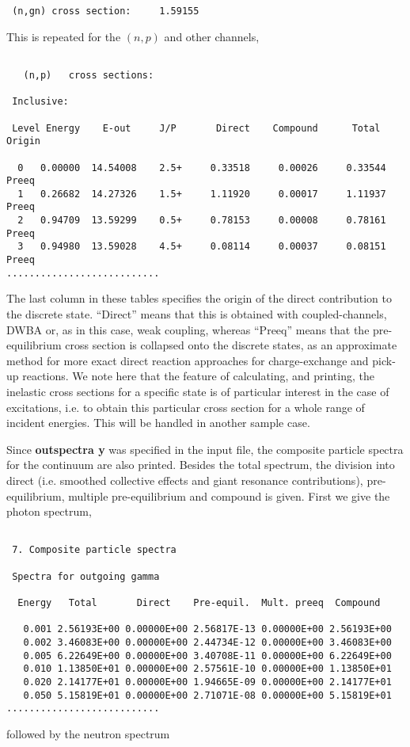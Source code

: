 \begin{samplecase}
{\begin{verbatim}
 (n,gn) cross section:     1.59155
\end{verbatim} } \renewcommand{\baselinestretch}{1.07}\small\normalsize
\noindent
This is repeated for the $(n,p)$ and other channels,

{\small \begin{verbatim}

   (n,p)   cross sections:

 Inclusive:

 Level Energy    E-out     J/P       Direct    Compound      Total     Origin

  0   0.00000  14.54008    2.5+     0.33518     0.00026     0.33544    Preeq
  1   0.26682  14.27326    1.5+     1.11920     0.00017     1.11937    Preeq
  2   0.94709  13.59299    0.5+     0.78153     0.00008     0.78161    Preeq
  3   0.94980  13.59028    4.5+     0.08114     0.00037     0.08151    Preeq
...........................
\end{verbatim} } \renewcommand{\baselinestretch}{1.07}\small\normalsize
\noindent
The last column in these tables specifies the origin of the direct contribution
to the discrete state. ``Direct'' means that this is obtained with 
coupled-channels, DWBA or, as in this case, weak coupling, whereas 
``Preeq'' means that the pre-equilibrium cross section is collapsed onto the 
discrete states, as an approximate method for more exact direct reaction 
approaches for charge-exchange and pick-up reactions.
We note here that the feature of calculating, and printing, the inelastic 
cross sections for a specific state is of particular interest in the case of
excitations, i.e. to obtain this particular cross section for a whole range of
incident energies. This will be handled in another sample case.

Since {\bf outspectra y} was specified in the input file, the composite
particle spectra for the continuum are also printed. Besides the total 
spectrum, the division into 
direct (i.e. smoothed collective effects and giant resonance contributions), 
pre-equilibrium, multiple pre-equilibrium and compound is given. First we give 
the photon spectrum,

{\small \begin{verbatim}

 7. Composite particle spectra

 Spectra for outgoing gamma

  Energy   Total       Direct    Pre-equil.  Mult. preeq  Compound

   0.001 2.56193E+00 0.00000E+00 2.56817E-13 0.00000E+00 2.56193E+00
   0.002 3.46083E+00 0.00000E+00 2.44734E-12 0.00000E+00 3.46083E+00
   0.005 6.22649E+00 0.00000E+00 3.40708E-11 0.00000E+00 6.22649E+00
   0.010 1.13850E+01 0.00000E+00 2.57561E-10 0.00000E+00 1.13850E+01
   0.020 2.14177E+01 0.00000E+00 1.94665E-09 0.00000E+00 2.14177E+01
   0.050 5.15819E+01 0.00000E+00 2.71071E-08 0.00000E+00 5.15819E+01
...........................
\end{verbatim} } \renewcommand{\baselinestretch}{1.07}\small\normalsize
\noindent
followed by the neutron spectrum


\end{samplecase}
